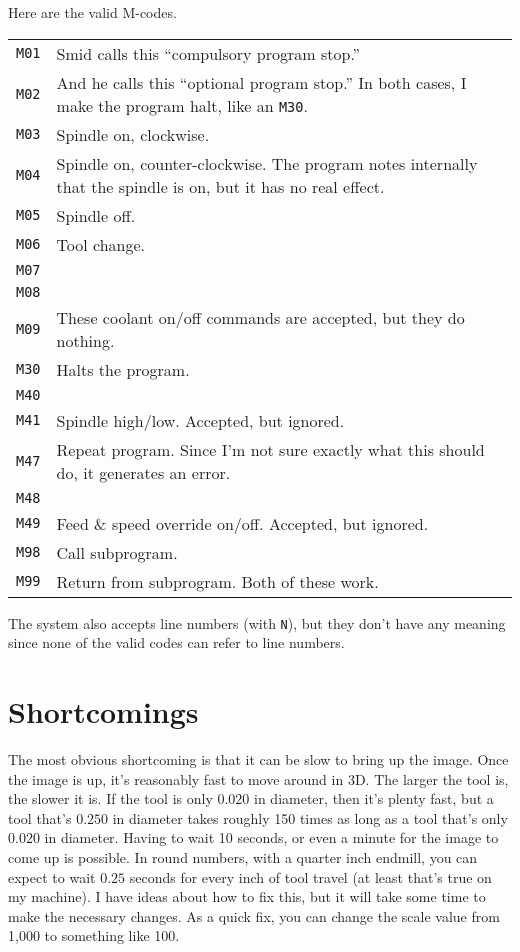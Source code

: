 \documentclass[titlepage,oneside,10pt]{article}
\begin{document}
Here are the valid M-codes.
\vskip 0.25cm
\begin{longtable}{lp{10cm}}
{\tt M01}&Smid calls this ``compulsory program stop.''\\
{\tt M02}&And he calls this ``optional program stop.'' In both cases,
I make the program halt, like an {\tt M30}.\\
{\tt M03}&Spindle on, clockwise.\\
{\tt M04}&Spindle on, counter-clockwise. The program notes internally
that the spindle is on, but it has no real effect.\\
{\tt M05}&Spindle off.\\
{\tt M06}&Tool change.\\
{\tt M07}&\\
{\tt M08}&\\
{\tt M09}&These coolant on/off commands are accepted, but they do
nothing.\\
{\tt M30}&Halts the program.\\
{\tt M40}&\\
{\tt M41}&Spindle high/low. Accepted, but ignored.\\
{\tt M47}&Repeat program. Since I'm not sure exactly what this should
do, it generates an error.\\
{\tt M48}&\\
{\tt M49}&Feed \& speed override on/off. Accepted, but ignored.\\
{\tt M98}&Call subprogram.\\
{\tt M99}&Return from subprogram. Both of these work.\\
\end{longtable}

The system also accepts line numbers (with {\tt N}), but they don't
have any meaning since none of the valid codes can refer to line numbers.

\section{Shortcomings}

The most obvious shortcoming is that it can be slow to bring up the
image. Once the image is up, it's reasonably fast to move around in
3D. The larger the tool is, the slower it is. If the tool is only
$0.020$ in diameter, then it's plenty fast, but a tool that's
$0.250$ in diameter takes roughly 150 times as long as a tool that's
only $0.020$ in diameter. Having to wait 10 seconds, or even a
minute for the image to come up is possible. In round numbers, with a
quarter inch endmill, you can expect to wait $0.25$ seconds for every
inch of tool travel (at least that's true on my machine). I have ideas
about how to fix this, but it will take some time to make the
necessary changes. As a quick fix, you can change the scale value from
1,000 to something like 100.
\end{document}
